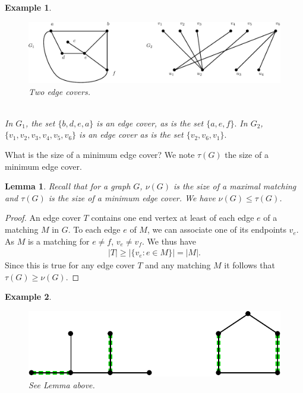\documentclass[12pt,a4paper]{article}
\newtheorem{lem}{Lemma}[section]
\newtheorem{exmp}{Example}[section]
\theoremstyle{definition}
\begin{document}
\begin{exmp} \
\begin{figure}[hbtp]
\centering
\includegraphics[scale=.65]{images/graph44.pdf}
\caption{Two edge covers.}
\end{figure}
\\
In $G_1$, the set $\{b,d,e,a\}$ is an edge cover, as is the set $\{a,e,f\}.$ In $G_2$, $\{v_1,v_2,v_3,v_4,v_5,v_6\}$ is an edge cover as is the set $\{v_2,v_6,v_1\}.$
\end{exmp}
What is the size of a minimum edge cover? We note $\tau (G)$ the size of a minimum edge cover. 
\begin{lem}\label{prevlemma} Recall that for a graph $G$, $\nu(G)$ is the size of a maximal matching and $\tau(G)$ is the size of a minimum edge cover. We have $
\nu(G) \leq \tau(G)$. 

\end{lem}
\begin{proof}
An edge cover $T$ contains one end vertex at least of each edge $e$ of a matching $M$ in $G$. To each edge $e$ of $M$, we can associate one of its endpoints $v_e$. As $M$ is a matching for $e \neq f$, $v_e \neq v_f$. We thus have \begin{align*}
|T| \geq | \{v_e : e \in M \} | = |M|.
\end{align*}
Since this is true for any edge cover $T$ and any matching $M$ it follows that 
$\tau(G) \geq \nu(G).$

\end{proof}
\begin{exmp} \
\begin{figure}[hbtp]
\centering
\includegraphics[scale=.65]{images/graph45.pdf}
\caption{See Lemma above.}
\end{figure}
\end{exmp}
\newpage
\end{document}
